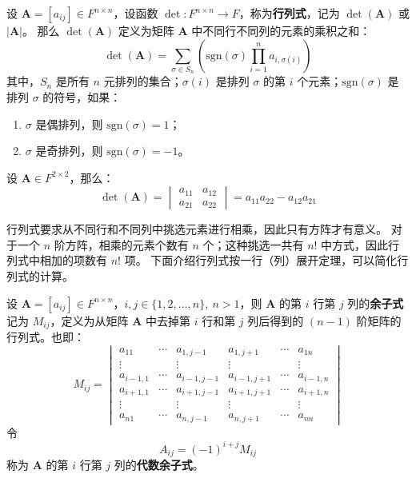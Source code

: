 \begin{definition}
    设 $\mathbf{A} = [a_{ij}] \in F^{n \times n}$，设函数 $\det : F^{n \times n} \to F$，称为\textbf{行列式}，记为 $\det(\mathbf{A})$ 或 $|\mathbf{A}|$。
    那么 $\det(\mathbf{A})$ 定义为矩阵 $\mathbf{A}$ 中不同行不同列的元素的乘积之和：
    \[
        \det(\mathbf{A}) = \sum_{\sigma \in S_n} \left( \mathrm{sgn}(\sigma) \prod_{i=1}^{n} a_{i,\sigma(i)} \right)
    \]
    其中，$S_n$ 是所有 $n$ 元排列的集合；$\sigma(i)$ 是排列 $\sigma$ 的第 $i$ 个元素；$\mathrm{sgn}(\sigma)$ 是排列 $\sigma$ 的符号，如果：
    \begin{enumerate}
        \item $\sigma$ 是偶排列，则 $\mathrm{sgn}(\sigma) = 1$；
        \item $\sigma$ 是奇排列，则 $\mathrm{sgn}(\sigma) = -1$。
    \end{enumerate}
\end{definition}

\begin{example}
    设 $\mathbf{A}\in F^{2\times 2}$，那么：
    \[
        \det(\mathbf{A}) = \begin{vmatrix}
            a_{11} & a_{12} \\
            a_{21} & a_{22}
        \end{vmatrix} = a_{11}a_{22} - a_{12}a_{21}
    \]
\end{example}

\begin{note}
    行列式要求从不同行和不同列中挑选元素进行相乘，因此只有方阵才有意义。
    对于一个 $n$ 阶方阵，相乘的元素个数有 $n$ 个；这种挑选一共有 $n!$ 中方式，因此行列式中相加的项数有 $n!$ 项。
    下面介绍行列式按一行（列）展开定理，可以简化行列式的计算。
\end{note}
\vspace{1em}

\begin{definition}
    设 $\mathbf{A} = [a_{ij}] \in F^{n \times n}$，$i,j\in\{1,2,\ldots,n\},\ n > 1$，则 $\mathbf{A}$ 的第 $i$ 行第 $j$ 列的\textbf{余子式}记为 $M_{ij}$，定义为从矩阵 $\mathbf{A}$ 中去掉第 $i$ 行和第 $j$ 列后得到的 $(n-1)$ 阶矩阵的行列式。也即：
    \[
        M_{ij}=\begin{vmatrix}a_{11} &\cdots & a_{1, j-1} & a_{1, j+1} & \cdots& a_{1 n} \\ \vdots &  & \vdots & \vdots & & \vdots \\ a_{i-1,1} & \cdots& a_{i-1, j-1} & a_{i-1, j+1} & \cdots & a_{i-1, n} \\ a_{i+1,1} & \cdots & a_{i+1, j-1} & a_{i+1, j+1} & \cdots & a_{i+1, n} \\ \vdots & & \vdots & \vdots & & \vdots \\ a_{n 1} & \cdots & a_{n, j-1} & a_{n, j+1} &\cdots & a_{n n} \end{vmatrix}
    \]
    令
    \[
        A_{ij} = (-1)^{i+j} M_{ij}
    \]
    称为 $\mathbf{A}$ 的第 $i$ 行第 $j$ 列的\textbf{代数余子式}。
\end{definition}

